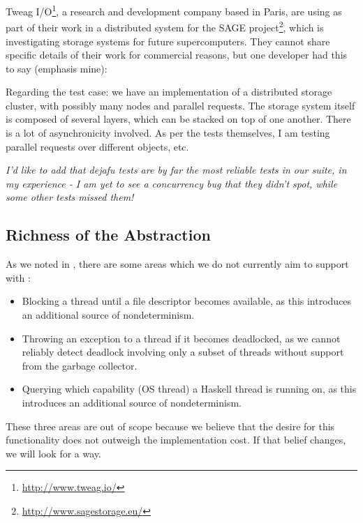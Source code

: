 Tweag I/O\footnote{\url{http://www.tweag.io/}}, a research and
development company based in Paris, are using \dejafu{} as part of
their work in a distributed system for the SAGE
project\footnote{\url{http://www.sagestorage.eu/}}, which is
investigating storage systems for future supercomputers.  They cannot
share specific details of their work for commercial reasons, but one
developer had this to say (emphasis mine):

\begin{displayquote}
  Regarding the test case: we have an implementation of a distributed
  storage cluster, with possibly many nodes and parallel requests.
  The storage system itself is composed of several layers, which can
  be stacked on top of one another.  There is a lot of asynchronicity
  involved.  As per the tests themselves, I am testing parallel
  requests over different objects, etc.

  \emph{I'd like to add that dejafu tests are by far the most reliable
    tests in our suite, in my experience - I am yet to see a
    concurrency bug that they didn't spot, while some other tests
    missed them!}\cite{tweag2017}
\end{displayquote}

\subsection{Richness of the Abstraction}

As we noted in , there are some areas which we
do not currently aim to support with \dejafu{}:

\begin{itemize}
\item Blocking a thread until a file descriptor becomes available, as
  this introduces an additional source of nondeterminism.
\item Throwing an exception to a thread if it becomes deadlocked, as
  we cannot reliably detect deadlock involving only a subset of
  threads without support from the garbage collector.
\item Querying which capability (OS thread) a Haskell thread is
  running on, as this introduces an additional source of
  nondeterminism.
\end{itemize}

These three areas are out of scope because we believe that the desire
for this functionality does not outweigh the implementation cost.  If
that belief changes, we will look for a way.

